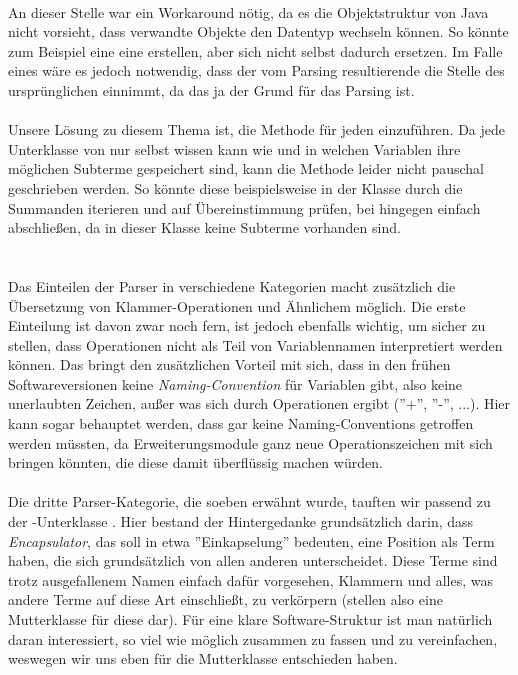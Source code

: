 \\
An dieser Stelle war ein Workaround nötig, da es die Objektstruktur von Java nicht vorsieht, dass verwandte Objekte den Datentyp wechseln können. So könnte zum Beispiel eine  eine  erstellen, aber sich nicht selbst dadurch ersetzen. Im Falle eines  wäre es jedoch notwendig, dass der vom Parsing resultierende  die Stelle des ursprünglichen  einnimmt, da das ja der Grund für das Parsing ist.\\
\\
Unsere Lösung zu diesem Thema ist, die Methode  für jeden  einzuführen. Da jede Unterklasse von  nur selbst wissen kann wie und in welchen Variablen ihre möglichen Subterme gespeichert sind, kann die Methode leider nicht pauschal geschrieben werden. So könnte diese beispielsweise in der Klasse  durch die Summanden iterieren und auf Übereinstimmung prüfen, bei  hingegen einfach abschließen, da in dieser Klasse keine Subterme vorhanden sind.\\
\\
\ \\
Das Einteilen der Parser in verschiedene Kategorien macht zusätzlich die Übersetzung von Klammer-Operationen und Ähnlichem möglich. Die erste Einteilung ist davon zwar noch fern, ist jedoch ebenfalls wichtig, um sicher zu stellen, dass Operationen nicht als Teil von Variablennamen interpretiert werden können. Das bringt den zusätzlichen Vorteil mit sich, dass in den frühen Softwareversionen keine \textit{Naming-Convention} für Variablen gibt, also keine unerlaubten Zeichen, außer was sich durch Operationen ergibt (''+'', ''-'', ...). Hier kann sogar behauptet werden, dass gar keine Naming-Conventions getroffen werden müssten, da Erweiterungsmodule ganz neue Operationszeichen mit sich bringen könnten, die diese damit überflüssig machen würden.\\
\\
Die dritte Parser-Kategorie, die soeben erwähnt wurde, tauften wir  passend zu der -Unterklasse . Hier bestand der Hintergedanke grundsätzlich darin, dass \textit{Encapsulator}, das soll in etwa ''Einkapselung'' bedeuten, eine Position als Term haben, die sich grundsätzlich von allen anderen unterscheidet. Diese Terme sind trotz ausgefallenem Namen einfach dafür vorgesehen, Klammern und alles, was andere Terme auf diese Art einschließt, zu verkörpern (stellen also eine Mutterklasse für diese dar). Für eine klare Software-Struktur ist man natürlich daran interessiert, so viel wie möglich zusammen zu fassen und zu vereinfachen, weswegen wir uns eben für die Mutterklasse entschieden haben.\\
